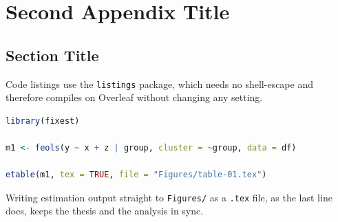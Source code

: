 
\chapter{Second Appendix Title}
\label{app:b}

\blindtext

\section{Section Title}
\label{sec:appendix-b-01}

Code listings use the \texttt{listings} package, which needs no
shell-escape and therefore compiles on Overleaf without changing any
setting.

\begin{lstlisting}[language=R, caption={A code listing.}, label=lst:code-01]
library(fixest)

m1 <- feols(y ~ x + z | group, cluster = ~group, data = df)

etable(m1, tex = TRUE, file = "Figures/table-01.tex")
\end{lstlisting}

Writing estimation output straight to \texttt{Figures/} as a \texttt{.tex}
file, as the last line does, keeps the thesis and the analysis in sync.
